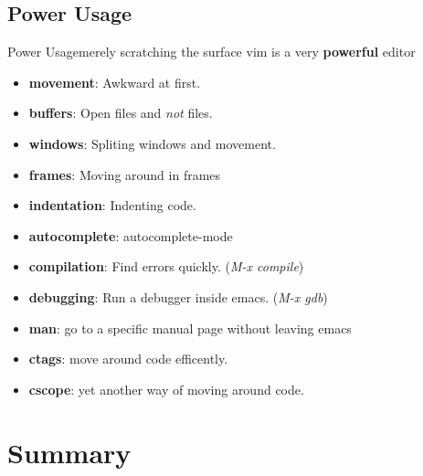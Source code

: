 \documentclass{beamer}
\begin{document}
\subsection{Power Usage}
\begin{frame}{Power Usage}{merely scratching the surface}
	vim is a very \textbf{powerful} editor \pause
	\begin{itemize}
			\item {
					\textbf{movement}: Awkward at first.
					\pause
					}
			\item {
					\textbf{buffers}: Open files and \textit{not} files.
					\pause
					}
			\item {
					\textbf{windows}: Spliting windows and movement.
					\pause
					}
			\item {
					\textbf{frames}: Moving around in frames
					\pause
					}
			\item {
					\textbf{indentation}: Indenting code.
					\pause
					}
			\item {
					\textbf{autocomplete}: autocomplete-mode
					\pause
					}
			\item {
					\textbf{compilation}: Find errors quickly. (\textit{M-x compile})
					\pause
					}
			\item {
					\textbf{debugging}: Run a debugger inside emacs. (\textit{M-x gdb})
					\pause
					}
			\item {
					\textbf{man}: go to a specific manual page without leaving emacs
					\pause
					}
			\item {
					\textbf{ctags}: move around code efficently.
					\pause
					}
			\item {
					\textbf{cscope}: yet another way of moving around code.
					}

	\end{itemize}
\end{frame}
\section*{Summary}
\end{document}
